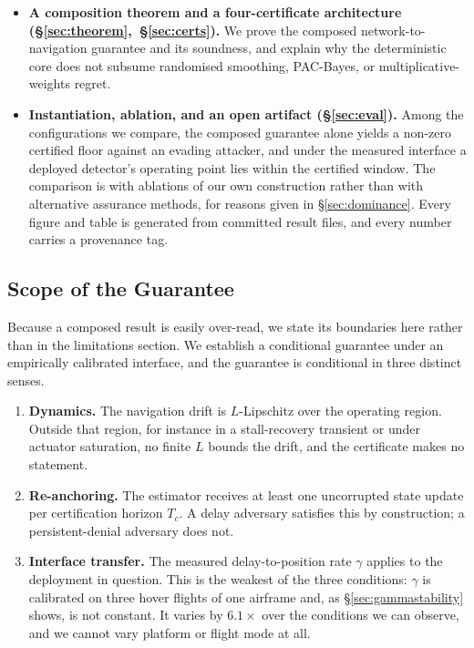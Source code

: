 \begin{itemize}
\item \textbf{A composition theorem and a four-certificate architecture
(\S\ref{sec:theorem},~\S\ref{sec:certs}).} We prove the composed
network-to-navigation guarantee and its soundness, and explain why the
deterministic core does not subsume randomised smoothing, PAC-Bayes, or
multiplicative-weights regret.

\item \textbf{Instantiation, ablation, and an open artifact
(\S\ref{sec:eval}).} Among the configurations we compare, the composed guarantee
alone yields a non-zero certified floor against an evading attacker, and under
the measured interface a deployed detector's operating point lies within the
certified window. The comparison is with ablations of our own construction
rather than with alternative assurance methods, for reasons given in
\S\ref{sec:dominance}. Every figure and table is generated from committed result
files, and every number carries a provenance tag.
\end{itemize}

\subsection*{Scope of the Guarantee}
\label{sec:scope}
Because a composed result is easily over-read, we state its boundaries here
rather than in the limitations section. We establish a conditional guarantee
under an empirically calibrated interface, and the guarantee is conditional in
three distinct senses.

\begin{enumerate}[label=(C\arabic*),leftmargin=2.6em]
\item\label{c:lip} \textbf{Dynamics.} The navigation drift is $L$-Lipschitz over
the operating region. Outside that region, for instance in a stall-recovery
transient or under actuator saturation, no finite $L$ bounds the drift, and the
certificate makes no statement.
\item\label{c:anchor} \textbf{Re-anchoring.} The estimator receives at least one
uncorrupted state update per certification horizon $T_c$. A delay adversary
satisfies this by construction; a persistent-denial adversary does not.
\item\label{c:interface} \textbf{Interface transfer.} The measured
delay-to-position rate $\gamma$ applies to the deployment in question. This is
the weakest of the three conditions: $\gamma$ is calibrated on three hover
flights of one airframe and, as \S\ref{sec:gammastability} shows, is not
constant. It varies by $6.1\times$ over the conditions we can observe, and we
cannot vary platform or flight mode at all.
\end{enumerate}


